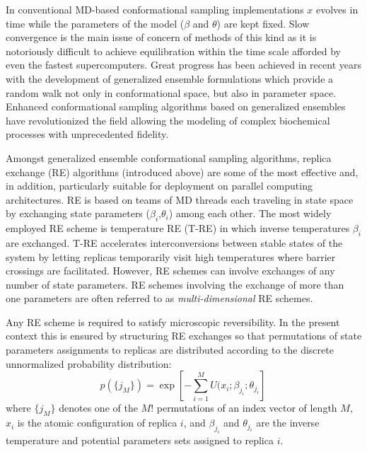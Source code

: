 \documentclass{sig-alternate}
\begin{document}
In conventional MD-based conformational sampling implementations $x$
evolves in time while the parameters of the model ($\beta$ and
$\theta$) are kept fixed. Slow convergence is the main issue of
concern of methods of this kind as it is notoriously difficult to
achieve equilibration within the time scale afforded by even the
fastest supercomputers. Great progress has been achieved in recent
years with the development of generalized ensemble formulations which
provide a random walk not only in conformational space,
but also in parameter space.  Enhanced conformational sampling
algorithms based on generalized ensembles have revolutionized the
field allowing the modeling of complex biochemical processes with
unprecedented fidelity.

Amongst generalized ensemble conformational sampling algorithms, replica exchange (RE)
algorithms (introduced above) are some of the most effective and, in addition,
particularly suitable for deployment on parallel computing architectures. RE is based on
teams of MD threads each traveling in state space by exchanging state parameters
($\beta_i$,$\theta_i$) among each other.  The most widely employed RE scheme is
temperature RE (T-RE) in which inverse temperatures $\beta_i$ are exchanged. T-RE
accelerates interconversions between stable states of the system by letting replicas
temporarily visit high temperatures where barrier crossings are facilitated. However, RE
schemes can involve exchanges of any number of state parameters. RE schemes involving
the exchange of more than one parameters are often referred to as
\emph{multi-dimensional} RE schemes.

Any RE scheme is required to satisfy microscopic reversibility. In the present context
this is ensured by structuring RE exchanges so that permutations of state parameters
assignments to replicas are distributed according to the discrete unnormalized
probability distribution:
\begin{equation}
p(\{j_M\})=\exp\left[-\sum_{i=1}^M U(x_i;\beta_{j_i};\theta_{j_i}\right] \,
\end{equation}
where $\{j_M\}$ denotes one of the $M!$ permutations of an index vector of length $M$,  $x_i$ is the atomic configuration of replica $i$, and $\beta_{j_i}$ and $\theta_{j_i}$ are the inverse temperature and potential parameters sets assigned to replica $i$.
\end{document}
